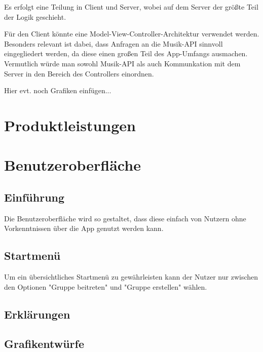 \documentclass[oneside, ngerman]{sdqtechreport}
\begin{document}
Es erfolgt eine Teilung in Client und Server, wobei auf dem Server der größte Teil der Logik geschieht.

Für den Client könnte eine Model-View-Controller-Architektur verwendet werden. Besonders relevant ist dabei, dass Anfragen an die Musik-API sinnvoll eingegliedert werden, da diese einen großen Teil des App-Umfangs ausmachen. Vermutlich würde man sowohl Musik-API als auch Kommunkation mit dem Server in den Bereich des Controllers einordnen.

Hier evt. noch Grafiken einfügen...



\chapter{Produktleistungen}
\label{chap:Produktleistungen}



\chapter{Benutzeroberfläche}
\label{chap:Benutzeroberfläche}

\section{Einführung}
\label{sec:Benutzeroberfläche:Einführung}
\textbf{} Die Benutzeroberfläche wird so gestaltet, dass diese einfach von Nutzern ohne Vorkenntnissen über die App genutzt werden kann. 

\section{Startmenü}
\label{sec:Benutzeroberfläche:Startmenü}
\textbf{}Um ein übersichtliches Startmenü zu gewährleisten kann der Nutzer nur zwischen den Optionen "Gruppe beitreten" und "Gruppe erstellen" wählen. 

\section{Erklärungen}
\label{sec:Benutzeroberfläche:Erklärungen}

\section{Grafikentwürfe}
\label{sec:Benutzeroberfläche:Grafikentwürfe}
\end{document}
